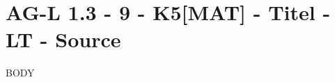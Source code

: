 \section{AG-L 1.3 - 9 - K5[MAT] - Titel - LT - Source}

\begin{beispiel}[AG-L 1.3]{1}
BODY
\end{beispiel}
